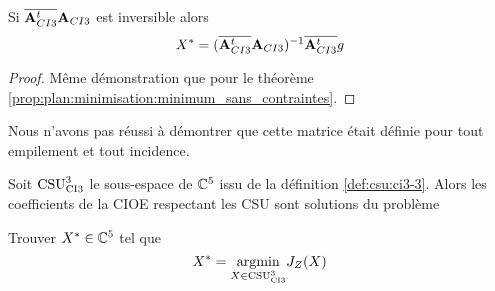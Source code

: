     \begin{prop}
      \label{prop:cylindre:minimisation:minimum_sans_contraintes}
      Si \(\conj{\mA_{CI3}^t}\mA_{CI3}\) est inversible alors
      \begin{equation*}
        X^* = (\conj{\mA_{CI3}^t}\mA_{CI3})^{-1}\conj{\mA_{CI3}^t}g
      \end{equation*}
    \end{prop}

    \begin{proof}
      Même démonstration que pour le théorème \ref{prop:plan:minimisation:minimum_sans_contraintes}.
    \end{proof}

    Nous n'avons pas réussi à démontrer que cette matrice était définie pour tout empilement et tout incidence.

    \begin{thm}

      Soit \(\CSU[3]{CI3}\) le sous-espace de \(\CC^5\) issu de la définition \ref{def:csu:ci3-3}.
      Alors les coefficients de la CIOE respectant les CSU sont solutions du problème

      Trouver \(X^* \in \CC^5\) tel que
      \begin{equation*}
        X^* = \argmin{X\in \CSU[3]{CI3}}  J_Z(X)
      \end{equation*}
    \end{thm}
